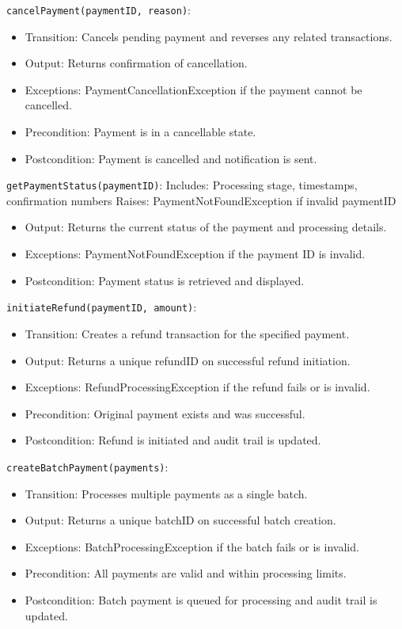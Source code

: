 \documentclass[12pt, titlepage]{article}
\begin{document}
\noindent \texttt{cancelPayment(paymentID, reason)}:
\begin{itemize}
    \item Transition: Cancels pending payment and reverses any related transactions.
    \item Output: Returns confirmation of cancellation.
    \item Exceptions: PaymentCancellationException if the payment cannot be cancelled.
    \item Precondition: Payment is in a cancellable state.
    \item Postcondition: Payment is cancelled and notification is sent.
\end{itemize}

\noindent \texttt{getPaymentStatus(paymentID)}:
Includes: Processing stage, timestamps, confirmation numbers
Raises: PaymentNotFoundException if invalid paymentID
\begin{itemize}
    \item Output: Returns the current status of the payment and processing details.
    \item Exceptions: PaymentNotFoundException if the payment ID is invalid.
    \item Postcondition: Payment status is retrieved and displayed.
\end{itemize}

\noindent \texttt{initiateRefund(paymentID, amount)}:
\begin{itemize}
    \item Transition: Creates a refund transaction for the specified payment.
    \item Output: Returns a unique refundID on successful refund initiation.
    \item Exceptions: RefundProcessingException if the refund fails or is invalid.
    \item Precondition: Original payment exists and was successful.
    \item Postcondition: Refund is initiated and audit trail is updated.
\end{itemize}

\noindent \texttt{createBatchPayment(payments)}:
\begin{itemize}
    \item Transition: Processes multiple payments as a single batch.
    \item Output: Returns a unique batchID on successful batch creation.
    \item Exceptions: BatchProcessingException if the batch fails or is invalid.
    \item Precondition: All payments are valid and within processing limits.
    \item Postcondition: Batch payment is queued for processing and audit trail is updated.
\end{itemize}
\end{document}
